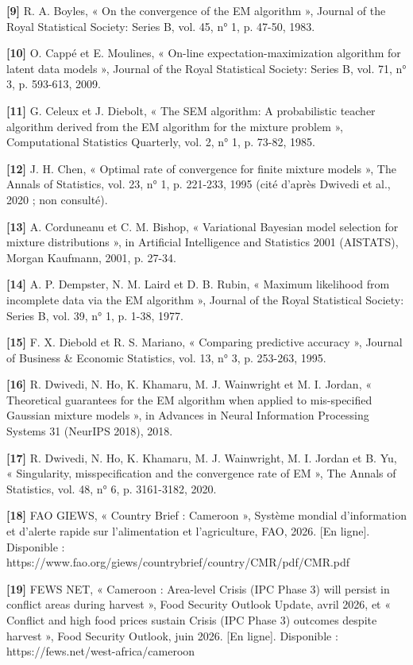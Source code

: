 \textbf{[9]  }R. A. Boyles, « On the convergence of the EM algorithm », Journal of the Royal Statistical Society: Series B, vol. 45, n° 1, p. 47-50, 1983.

\textbf{[10]  }O. Cappé et E. Moulines, « On-line expectation-maximization algorithm for latent data models », Journal of the Royal Statistical Society: Series B, vol. 71, n° 3, p. 593-613, 2009.

\textbf{[11]  }G. Celeux et J. Diebolt, « The SEM algorithm: A probabilistic teacher algorithm derived from the EM algorithm for the mixture problem », Computational Statistics Quarterly, vol. 2, n° 1, p. 73-82, 1985.

\textbf{[12]  }J. H. Chen, « Optimal rate of convergence for finite mixture models », The Annals of Statistics, vol. 23, n° 1, p. 221-233, 1995 (cité d'après Dwivedi et al., 2020 ; non consulté).

\textbf{[13]  }A. Corduneanu et C. M. Bishop, « Variational Bayesian model selection for mixture distributions », in Artificial Intelligence and Statistics 2001 (AISTATS), Morgan Kaufmann, 2001, p. 27-34.

\textbf{[14]  }A. P. Dempster, N. M. Laird et D. B. Rubin, « Maximum likelihood from incomplete data via the EM algorithm », Journal of the Royal Statistical Society: Series B, vol. 39, n° 1, p. 1-38, 1977.

\textbf{[15]  }F. X. Diebold et R. S. Mariano, « Comparing predictive accuracy », Journal of Business \& Economic Statistics, vol. 13, n° 3, p. 253-263, 1995.

\textbf{[16]  }R. Dwivedi, N. Ho, K. Khamaru, M. J. Wainwright et M. I. Jordan, « Theoretical guarantees for the EM algorithm when applied to mis-specified Gaussian mixture models », in Advances in Neural Information Processing Systems 31 (NeurIPS 2018), 2018.

\textbf{[17]  }R. Dwivedi, N. Ho, K. Khamaru, M. J. Wainwright, M. I. Jordan et B. Yu, « Singularity, misspecification and the convergence rate of EM », The Annals of Statistics, vol. 48, n° 6, p. 3161-3182, 2020.

\textbf{[18]  }FAO GIEWS, « Country Brief : Cameroon », Système mondial d'information et d'alerte rapide sur l'alimentation et l'agriculture, FAO, 2026. [En ligne]. Disponible : https://www.fao.org/giews/countrybrief/country/CMR/pdf/CMR.pdf

\textbf{[19]  }FEWS NET, « Cameroon : Area-level Crisis (IPC Phase 3) will persist in conflict areas during harvest », Food Security Outlook Update, avril 2026, et « Conflict and high food prices sustain Crisis (IPC Phase 3) outcomes despite harvest », Food Security Outlook, juin 2026. [En ligne]. Disponible : https://fews.net/west-africa/cameroon

